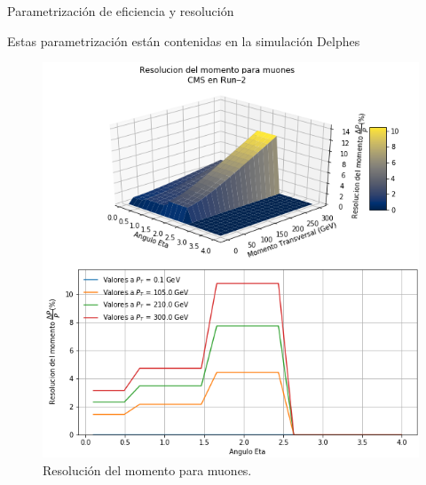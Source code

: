 \begin{frame}{Parametrización de eficiencia y resolución}

Estas parametrizaci\'on est\'an contenidas en la simulaci\'on Delphes


    \begin{figure}[ht]
        \begin{minipage}[b]{0.45\linewidth}
            \centering
            \includegraphics[width=\textwidth]{Imag/Momentum_resolution_of_Muon_CMS.png}
            \caption{Resolución del momento para muones.}
            \label{fig:a}
        \end{minipage}
        \hspace{0.5cm}
        \begin{minipage}[b]{0.45\linewidth}
            \centering

\end{minipage}
\end{figure}
\end{frame}
